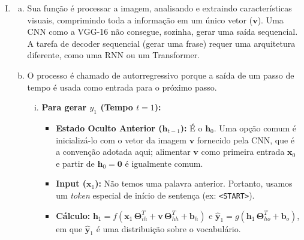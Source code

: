 \documentclass{dlproblemset}
\begin{document}
\begin{enumerate}[I)]
    $\theta_{hh}=1$

    $\theta_{ih}=1$

    $b_{h}= -1$

    $\theta_{ho}=1$

    $b_{o}=0$
    
    \item 
        \begin{enumerate}[a)]
            \item Sua função é processar a imagem, analisando e extraindo características visuais, comprimindo toda a informação em um único vetor ($\mathbf{v}$). Uma CNN como a VGG-16 não consegue, sozinha, gerar uma saída sequencial. A tarefa de decoder sequencial (gerar uma frase) requer uma arquitetura diferente, como uma RNN ou um Transformer.


            \item O processo é chamado de autorregressivo porque a saída de um passo de tempo é usada como entrada para o próximo passo.
                        \begin{enumerate}[i.]
                            \item \textbf{Para gerar $y_1$ (Tempo $t=1$):}
                                \begin{itemize}
                                    \item \textbf{Estado Oculto Anterior ($\mathbf{h}_{t-1}$):} É o $\mathbf{h}_0$. Uma opção comum é inicializá-lo com o vetor da imagem $\mathbf{v}$ fornecido pela CNN, que é a convenção adotada aqui; alimentar $\mathbf{v}$ como primeira entrada $\mathbf{x}_0$ e partir de $\mathbf{h}_0 = \mathbf{0}$ é igualmente comum.

                                    \item \textbf{Input ($\mathbf{x}_1$):} Não temos uma palavra anterior. Portanto, usamos um \textit{token} especial de início de sentença (ex: \texttt{<START>}).

                                    \item \textbf{Cálculo:} $\mathbf{h}_1 = f(\mathbf{x}_1\,\mathbf{\Theta}_{ih}^{T} + \mathbf{v}\,\mathbf{\Theta}_{hh}^{T} + \mathbf{b}_h)$ e $\hat{\mathbf{y}}_1 = g(\mathbf{h}_1\,\mathbf{\Theta}_{ho}^{T} + \mathbf{b}_o)$, em que $\hat{\mathbf{y}}_1$ é uma distribuição sobre o vocabulário.
                                \end{itemize}
                        

\end{enumerate}
\end{enumerate}
\end{enumerate}
\end{document}
